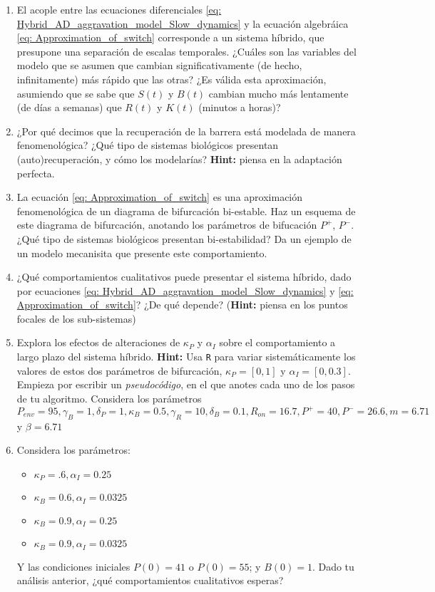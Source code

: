 \documentclass[10pt,letterpaper]{article}
\begin{document}
\begin{enumerate}
\item El acople entre las ecuaciones diferenciales \ref{eq: Hybrid_AD_aggravation_model_Slow_dynamics} y la ecuación algebráica \ref{eq: Approximation_of_switch} corresponde a un sistema híbrido, que presupone una separación de escalas temporales. ¿Cuáles son las variables del modelo que se asumen que cambian significativamente (de hecho, infinitamente) más rápido que las otras? ¿Es válida esta aproximación, asumiendo que se sabe que $S(t)$ y $B(t)$ cambian mucho más lentamente (de días a semanas) que $R(t)$ y $K(t)$ (minutos a horas)? 
\item ¿Por qué decimos que la recuperación de la barrera está modelada de manera fenomenológica? ¿Qué tipo de sistemas biológicos presentan (auto)recuperación, y cómo los modelarías? \textbf{Hint:} piensa en la adaptación perfecta.
\item La ecuación \ref{eq: Approximation_of_switch} es una aproximación fenomenológica de un diagrama de bifurcación bi-estable. Haz un esquema de este diagrama de bifurcación, anotando los parámetros de bifucación $P^+$, $P^-$. ¿Qué tipo de sistemas biológicos presentan bi-estabilidad? Da un ejemplo de un modelo mecanisita que presente este comportamiento.
\item ¿Qué comportamientos cualitativos puede presentar el sistema híbrido, dado por ecuaciones \ref{eq: Hybrid_AD_aggravation_model_Slow_dynamics} y \ref{eq: Approximation_of_switch}? ¿De qué depende? (\textbf{Hint:} piensa en los puntos focales de los sub-sistemas) 
\item Explora los efectos de alteraciones de $\kappa_P$ y $\alpha_{I}$ sobre el comportamiento a largo plazo del sistema híbrido.  \textbf{Hint:}  Usa \verb|R| para variar sistemáticamente  los valores de estos dos parámetros de bifurcación, $\kappa_P=[0,1]$ y $\alpha_{I}=[0, 0.3]$. Empieza por escribir un \textit{pseudocódigo}, en el que anotes cada uno de los pasos de tu algoritmo.
Considera los parámetros $P_{env}=95, \gamma_B=1,  \delta_P=1, \kappa_B= 0.5, \gamma_{R}=10, \delta_B=0.1, 
R_{on}=16.7, P^+=40, P^-= 26.6, m=6.71$ y $\beta=6.71$     
\item Considera los parámetros:
\begin{itemize}
\item $\kappa_P=.6, \alpha_I=0.25$ %
\item $\kappa_B=0.6, \alpha_I=0.0325$ %
\item $\kappa_B=0.9, \alpha_I=0.25$ %
\item $\kappa_B=0.9, \alpha_I=0.0325$ %
\end{itemize}
Y las condiciones iniciales $P(0)=41$ o $P(0)=55$; y $B(0)=1$.
Dado tu análisis anterior, ¿qué comportamientos cualitativos esperas?  
\end{enumerate}




\end{document}
